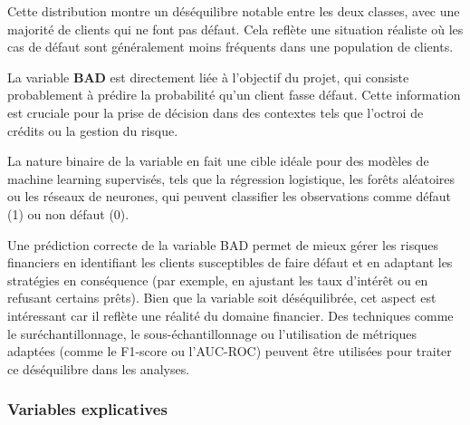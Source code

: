 \documentclass[a4paper,12pt]{report}
\begin{document}
Cette distribution montre un déséquilibre notable entre les deux classes, avec une majorité de clients qui ne font pas défaut. 
Cela reflète une situation réaliste où les cas de défaut sont généralement moins fréquents dans une population de clients. \newline

La variable \textbf{BAD} est directement liée à l'objectif du projet, qui consiste probablement à prédire la probabilité qu'un client fasse défaut.
Cette information est cruciale pour la prise de décision dans des contextes tels que l'octroi de crédits ou la gestion du risque.

La nature binaire de la variable en fait une cible idéale pour des modèles de machine learning supervisés, tels que la régression logistique, 
les forêts aléatoires ou les réseaux de neurones, qui peuvent classifier les observations comme défaut (1) ou non défaut (0).

Une prédiction correcte de la variable BAD permet de mieux gérer les risques financiers en identifiant les clients susceptibles 
de faire défaut et en adaptant les stratégies en conséquence (par exemple, en ajustant les taux d'intérêt ou en refusant certains prêts).
\bigbreak
Bien que la variable soit déséquilibrée, cet aspect est intéressant car il reflète une réalité du domaine financier. Des techniques comme le suréchantillonnage, le sous-échantillonnage ou 
l'utilisation de métriques adaptées (comme le F1-score ou l'AUC-ROC) peuvent être utilisées pour traiter ce déséquilibre dans les analyses.

\subsubsection{Variables explicatives}
\end{document}
